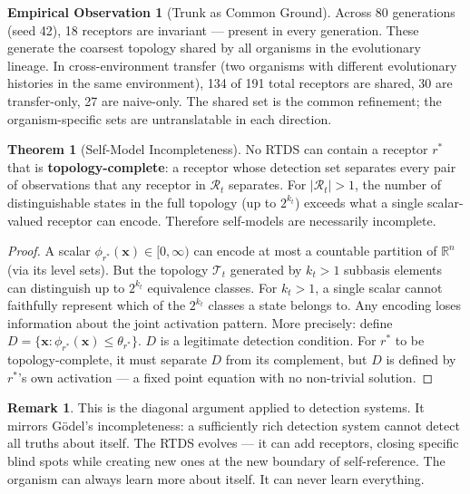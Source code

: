 \documentclass[12pt]{article}
\theoremstyle{definition}
\newtheorem{theorem}{Theorem}
\newtheorem{remark}{Remark}
\newtheorem{observation}{Empirical Observation}
\begin{document}
\begin{observation}[Trunk as Common Ground]
Across 80 generations (seed 42), 18 receptors are invariant --- present in every generation.
These generate the coarsest topology shared by all organisms in the evolutionary lineage.
In cross-environment transfer (two organisms with different evolutionary histories in the
same environment), 134 of 191 total receptors are shared, 30 are transfer-only, 27 are
naive-only. The shared set is the common refinement; the organism-specific sets are
untranslatable in each direction.
\end{observation}

\begin{theorem}[Self-Model Incompleteness]
No RTDS can contain a receptor $r^*$ that is \textbf{topology-complete}: a receptor whose
detection set separates every pair of observations that any receptor in $\mathcal{R}_t$
separates. For $|\mathcal{R}_t| > 1$, the number of distinguishable states in the full
topology (up to $2^{k_t}$) exceeds what a single scalar-valued receptor can encode.
Therefore self-models are necessarily incomplete.
\end{theorem}

\begin{proof}
A scalar $\phi_{r^*}(\mathbf{x}) \in [0, \infty)$ can encode at most a countable partition
of $\mathbb{R}^n$ (via its level sets). But the topology $\mathcal{T}_t$ generated by $k_t > 1$
subbasis elements can distinguish up to $2^{k_t}$ equivalence classes. For $k_t > 1$, a single
scalar cannot faithfully represent which of the $2^{k_t}$ classes a state belongs to. Any
encoding loses information about the joint activation pattern. More precisely: define
$D = \{\mathbf{x} : \phi_{r^*}(\mathbf{x}) \leq \theta_{r^*}\}$. $D$ is a legitimate
detection condition. For $r^*$ to be topology-complete, it must separate $D$ from its
complement, but $D$ is defined by $r^*$'s own activation --- a fixed point equation with
no non-trivial solution.
\end{proof}

\begin{remark}
This is the diagonal argument applied to detection systems. It mirrors G\"odel's
incompleteness: a sufficiently rich detection system cannot detect all truths about itself.
The RTDS evolves --- it can add receptors, closing specific blind spots while creating new
ones at the new boundary of self-reference. The organism can always learn more about itself.
It can never learn everything.
\end{remark}
\end{document}
